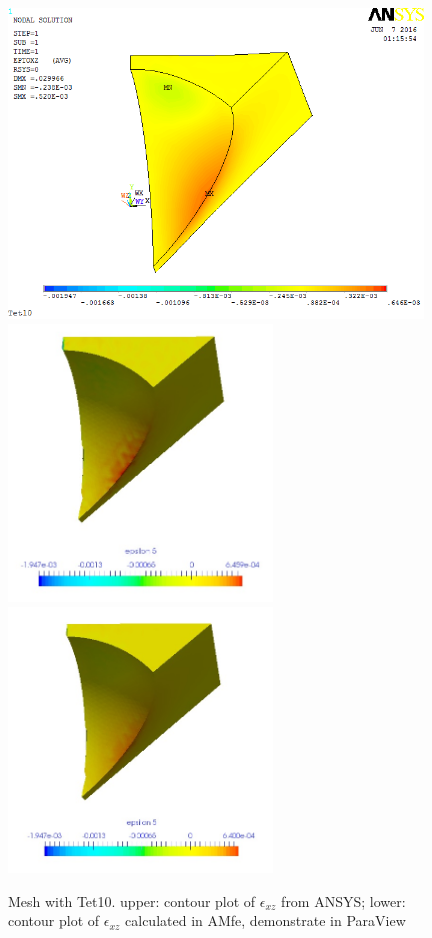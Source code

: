 \begin{figure}[htbp]
	\begin{center}
		\includegraphics[width=11cm,clip]{Tet10_Exz.png} 
		\includegraphics[width=7cm,clip]{Tet10_Exz_PD.png} 			
		\includegraphics[width=7cm,clip]{Tet10_Exz_P.png} 		
		\caption{Mesh with Tet10. upper: contour plot of $\epsilon_{xz}$ from ANSYS; lower: contour plot of $\epsilon_{xz}$ calculated in AMfe, demonstrate in ParaView} \label{fig: Tet10_Exz}
	\end{center}
\end{figure}
\clearpage 

